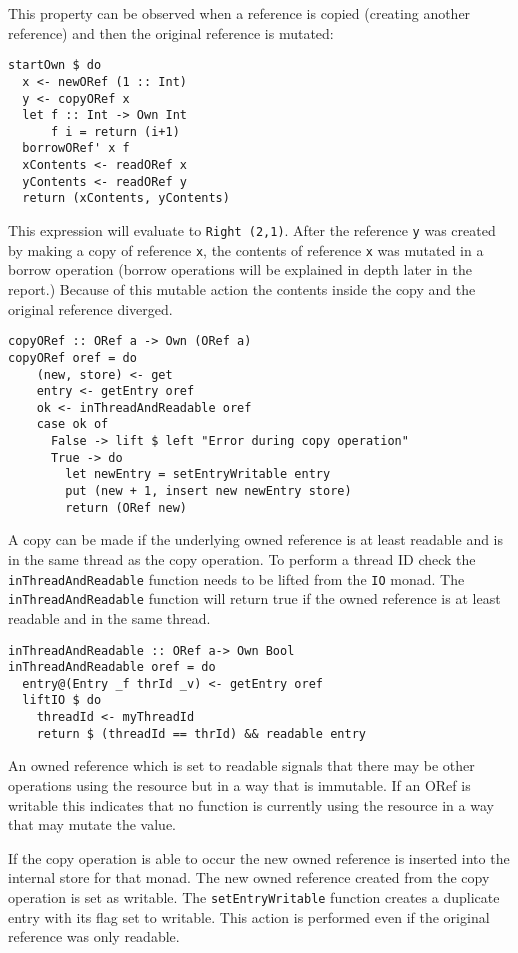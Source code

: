 \documentclass[onehalf,11pt]{beavtex}
\begin{document}
This property can be observed when a reference is copied (creating another
reference) and then the original reference is mutated:

\begin{lstlisting}
startOwn $ do
  x <- newORef (1 :: Int)
  y <- copyORef x
  let f :: Int -> Own Int
      f i = return (i+1)
  borrowORef' x f
  xContents <- readORef x
  yContents <- readORef y
  return (xContents, yContents)
\end{lstlisting}

This expression will evaluate to \texttt{Right (2,1)}.
After the reference \texttt{y} was created by making a copy of
reference \texttt{x}, the contents of reference \texttt{x}
was mutated in a borrow operation (borrow operations will be explained in depth
later in the report.)
Because of this mutable action the contents inside the copy and the original
reference diverged.

\begin{verbatim}
copyORef :: ORef a -> Own (ORef a)
copyORef oref = do
    (new, store) <- get
    entry <- getEntry oref
    ok <- inThreadAndReadable oref
    case ok of
      False -> lift $ left "Error during copy operation"
      True -> do
        let newEntry = setEntryWritable entry
        put (new + 1, insert new newEntry store)
        return (ORef new)
\end{verbatim}

A copy can be made if the underlying owned reference is at least readable and
is in the same thread as the copy operation.
To perform a thread ID check the \texttt{inThreadAndReadable} function
needs to be lifted from the \texttt{IO} monad.
The \texttt{inThreadAndReadable} function will return true if the owned reference
is at least readable and in the same thread.

\begin{verbatim}
inThreadAndReadable :: ORef a-> Own Bool
inThreadAndReadable oref = do
  entry@(Entry _f thrId _v) <- getEntry oref
  liftIO $ do
    threadId <- myThreadId
    return $ (threadId == thrId) && readable entry
\end{verbatim}

An owned reference which is set to readable signals that there may be other
operations using the resource but in a way that is immutable.
If an ORef is writable this indicates that no function is currently using the
resource in a way that may mutate the value.

If the copy operation is able to occur the new owned reference is inserted into
the internal store for that monad.  The new owned reference created from the copy
operation is set as writable. The \texttt{setEntryWritable} function
creates a duplicate entry with its flag set to writable.
This action is performed even if the original reference was only
readable.
\end{document}
